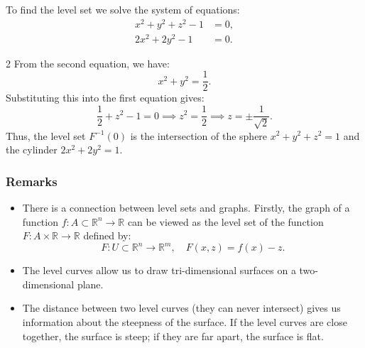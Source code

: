 \documentclass[11pt]{article}
\begin{document}
To find the level set we solve the system of equations:
\begin{align*}
x^2 + y^2 + z^2 - 1 & = 0, \\
2x^2 + 2y^2 - 1 & = 0.
\end{align*}
\begin{multicols}{2}
From the second equation, we have:
\[ x^2 + y^2 = \frac{1}{2}. \]
Substituting this into the first equation gives:
\[ \frac{1}{2} + z^2 - 1 = 0 \implies z^2 = \frac{1}{2} \implies z = \pm \frac{1}{\sqrt{2}}. \]
Thus, the level set $F^{-1}(0)$ is the intersection of the sphere $x^2 + y^2 + z^2 = 1$ and the cylinder $2x^2 + 2y^2 = 1$.
\begin{center}
\end{center}
\end{multicols}

\subsubsection*{Remarks}
\begin{itemize}
    \item There is a connection between level sets and graphs. Firstly, the graph of a function $f : A \subset \mathbb{R}^n \to \mathbb{R}$ can be viewed as the level set of the function $F : A \times \mathbb{R} \to \mathbb{R}$ defined by:
        \[ F : U \subset \mathbb{R}^n \to \mathbb{R}^m, \quad F(x, z) = f(x) - z. \]

    \item The level curves allow us to draw tri-dimensional surfaces on a two-dimensional plane. 
    \item The distance between two level curves (they can never intersect) gives us information about the steepness of the surface. If the level curves are close together, the surface is steep; if they are far apart, the surface is flat.
\end{itemize}
\end{document}
